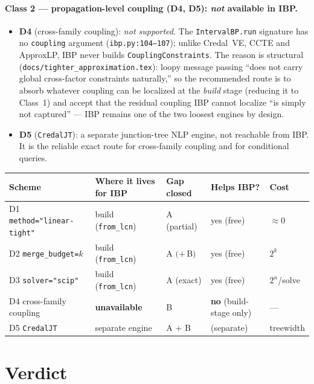 \documentclass[11pt]{article}
\begin{document}
\paragraph{Class 2 --- propagation-level coupling (D4, D5): \emph{not} available in IBP.}
\begin{itemize}
  \item \textbf{D4} (cross-family coupling): \emph{not supported}. The \texttt{IntervalBP.run}
    signature has no \texttt{coupling} argument (\texttt{ibp.py:104--107}); unlike Credal~VE, CCTE
    and ApproxLP, IBP never builds \texttt{CouplingConstraints}. The reason is structural
    (\texttt{docs/tighter\_approximation.tex}): loopy message passing ``does not carry global
    cross-factor constraints naturally,'' so the recommended route is to absorb whatever coupling can
    be localized at the \emph{build} stage (reducing it to Class~1) and accept that the residual
    coupling IBP cannot localize ``is simply not captured'' --- IBP remains one of the two loosest
    engines by design.
  \item \textbf{D5} (\texttt{CredalJT}): a separate junction-tree NLP engine, not reachable from IBP.
    It is the reliable exact route for cross-family coupling and for conditional queries.
\end{itemize}

\begin{center}\small
\begin{tabular}{lllll}
\toprule
Scheme & Where it lives for IBP & Gap closed & Helps IBP? & Cost \\
\midrule
D1 \texttt{method="linear-tight"} & build (\texttt{from\_lcn}) & A (partial) & yes (free) & $\approx 0$ \\
D2 \texttt{merge\_budget=$k$}     & build (\texttt{from\_lcn}) & A $(+\,$B$)$ & yes (free) & $2^k$ \\
D3 \texttt{solver="scip"}         & build (\texttt{from\_lcn}) & A (exact)   & yes (free) & $2^n$/solve \\
D4 cross-family coupling          & \textbf{unavailable}       & B           & \textbf{no} (build-stage only) & --- \\
D5 \texttt{CredalJT}              & separate engine            & A $+$ B     & (separate) & treewidth \\
\bottomrule
\end{tabular}
\end{center}

\section{Verdict}\label{sec:verdict}
\end{document}
